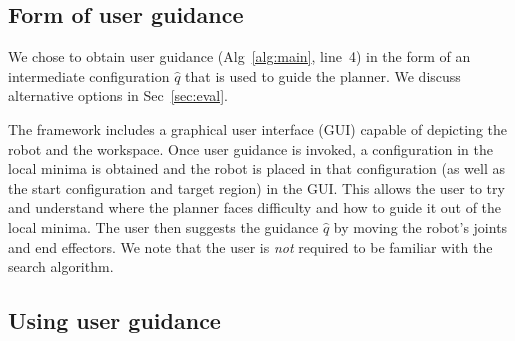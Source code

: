 \documentclass[conference]{IEEEtran}
\begin{document}
%
%
%
%

\subsection{Form of user guidance}
\label{sec:q2}
We chose to obtain user guidance 
(Alg~\ref{alg:main}, line~4)
in the form of an intermediate configuration $\hat{q}$ that is used to guide the planner. We discuss alternative options in Sec~\ref{sec:eval}.

The framework includes a graphical user interface (GUI) capable of  depicting the robot and the workspace.
Once user guidance is invoked, 
a configuration in the local minima is obtained and the robot is placed in that configuration (as well as the start configuration and target region) in the GUI.
This allows the user to try and understand where the planner faces difficulty and how to guide it out of the local minima.
The user then suggests the guidance $\hat{q}$ by moving the robot's joints and end effectors.
We note that the user is \emph{not} required to be familiar with the search algorithm.

\subsection{Using user guidance}
\label{sec:q3}


\end{document}
